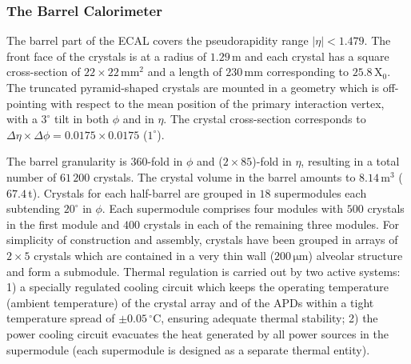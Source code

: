 \subsubsection{The Barrel Calorimeter}
The barrel part of the ECAL covers the pseudorapidity range $|\eta| < 1.479$.
The front face of the crystals is at a radius of $1.29 \,$m and each crystal has a square cross-section of $ 22 \times 22 \,$mm$^2$ and a length of $230 \,$mm corresponding to $25.8 \,$X$_0$. The truncated pyramid-shaped crystals are mounted in a geometry which is off-pointing with respect to the mean position of the primary interaction vertex, with a $3^{\circ}$ tilt in both $\phi$ and in $\eta$. The crystal cross-section corresponds to $\Delta \eta \times \Delta \phi = 0.0175 \times 0.0175$ ($1^{\circ}$). 

The barrel granularity is $360$-fold in $\phi$ and ($2 \times 85$)-fold in $\eta$, resulting in a total number of $61\,200$ crystals. The crystal volume in the barrel amounts to $8.14 \,$m$^3$ ($67.4 \,$t). Crystals for each half-barrel are grouped in $18$ supermodules each subtending $20^{\circ}$ in $\phi$. Each supermodule comprises four modules with $500$ crystals in the first module and $400$ crystals in each of the remaining three modules. For simplicity of construction and assembly, crystals have been grouped in arrays of $2 \times 5$ crystals which are contained in a very thin wall ($200 \,\mathrm{\mu m}$) alveolar structure and form a submodule.  Thermal regulation is carried out by two active systems: 1) a specially regulated cooling circuit which keeps the operating temperature (ambient temperature) of the crystal array and of the APDs within a tight temperature spread of $\pm0.05 \, ^{\circ}$C, ensuring adequate thermal stability; 2) the power cooling circuit evacuates the heat generated by all power sources in the supermodule (each supermodule is designed as a separate thermal entity).


